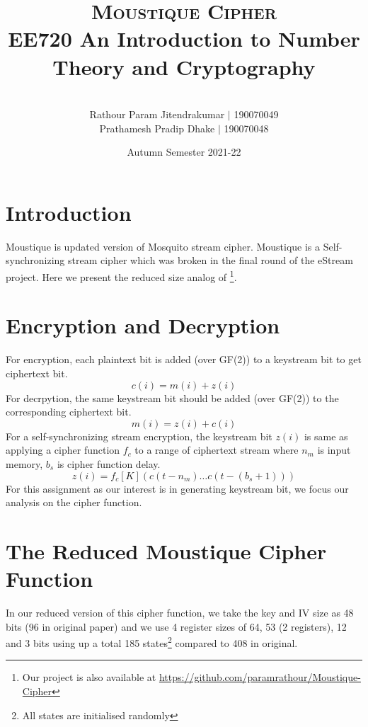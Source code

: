\documentclass[a4paper,10pt]{article}
\title{\vspace*{-2em}\textsc{Moustique Cipher}\\[0.5em]\Large{{EE720 {An Introduction to Number Theory and Cryptography}}}}
\author{\\[-3em]Rathour Param Jitendrakumar $\vert$ 190070049\\Prathamesh Pradip
Dhake $\vert$ 190070048}
\date{\vspace*{-1em}Autumn Semester 2021-22}
\begin{document}
\maketitle
\tableofcontents
\section{Introduction}
Moustique\cite{v3} is updated version of Mosquito\cite{v2} stream cipher. Moustique is a Self-synchronizing stream cipher which was broken in the final round of the eStream project. Here we present the reduced size analog of \cite{v3}\footnote{Our project is also available at \url{https://github.com/paramrathour/Moustique-Cipher}}.
\section{Encryption and Decryption}
For encryption, each plaintext bit is added (over GF(2)) to a keystream bit to get ciphertext bit.
\begin{equation}
    c(i) = m(i) + z(i)
\end{equation}
For decrpytion, the same keystream bit should be added (over GF(2)) to the corresponding ciphertext bit.
\begin{equation}
    m(i) = z(i) + c(i)
\end{equation}
For a self-synchronizing stream encryption, the keystream bit $z(i)$ is same as applying a cipher function $f_c$ to a range of ciphertext stream where $n_m$ is input memory, $b_s$ is cipher function delay.
\begin{equation}
    z(i) = f_c[K](c(t-n_m)\ldots c(t-(b_s+1)))
\end{equation}
For this assignment as our interest is in generating keystream bit, we focus our analysis on the cipher function.
\section{The Reduced Moustique Cipher Function}
In our reduced version of this cipher function, we take the key and IV size as 48 bits (96 in original paper) and we use 4 register sizes of 64, 53 (2 registers), 12 and 3 bits using up a total 185 states\footnote{All states are initialised randomly} compared to 408 in original.
\end{document}
